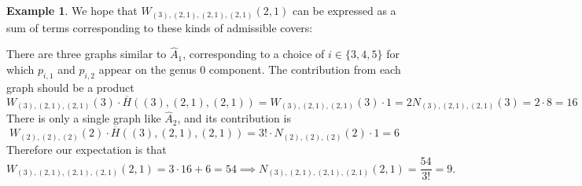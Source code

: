 \documentclass[thesis]{thesis-umich}           %
\theoremstyle{definition}
\newtheorem{eg}[thm]{Example}
\begin{document}
\begin{eg}

                                    We hope that $W_{(3),(2,1),(2,1),(2,1)}(2,1)$ can be expressed
                                    as a sum of terms corresponding to these kinds of
                                    admissible covers:

                                    There are three graphs similar to $\hat A_1$, corresponding to a choice of $i\in\{3,4,5\}$ for which $p_{i,1}$ and $p_{i,2}$ appear on the genus $0$ component. The contribution from each graph should be a product
                                    \[
                                    W_{(3),(2,1),(2,1)}(3)\cdot \overline H((3),(2,1),(2,1))=W_{(3),(2,1),(2,1)}(3)\cdot 1=2N_{(3),(2,1),(2,1)}(3)=2\cdot 8=16
                                    \]
                                    There is only a single graph like $\hat A_2$,
                                    and its contribution is
                                    \[
                                    W_{(2),(2),(2)}(2)\cdot \overline H((3),(2,1),(2,1))=3!\cdot N_{(2),(2),(2)}(2)\cdot 1=6
                                    \]
                                    Therefore our expectation is that
                                    \[
                                    W_{(3),(2,1),(2,1),(2,1)}(2,1)=3\cdot 16+6=54\implies N_{(3),(2,1),(2,1),(2,1)}(2,1)=\frac{54}{3!}=9.
                                    \]
  \end{eg}
\end{document}
